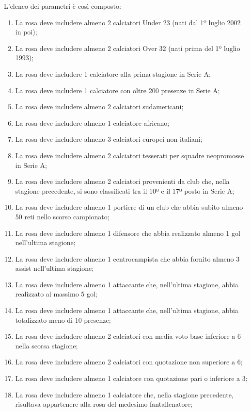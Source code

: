 \noindent L'elenco dei parametri è così composto:
\begin{enumerate}
    \item La rosa deve includere almeno 2 calciatori Under 23 (nati dal 1º luglio 2002 in poi);
    \item La rosa deve includere almeno 2 calciatori Over 32 (nati prima del 1º luglio 1993);
    \item La rosa deve includere 1 calciatore alla prima stagione in Serie A;
    \item La rosa deve includere 1 calciatore con oltre 200 presenze in Serie A;
    \item La rosa deve includere almeno 2 calciatori sudamericani;
    \item La rosa deve includere almeno 1 calciatore africano;
    \item La rosa deve includere almeno 3 calciatori europei non italiani;
    \item La rosa deve includere almeno 2 calciatori tesserati per squadre neopromosse in Serie A;
    \item La rosa deve includere almeno 2 calciatori provenienti da club che, nella stagione precedente, si sono classificati tra il 10º e il 17º posto in Serie A;
    \item La rosa deve includere almeno 1 portiere di un club che abbia subito almeno 50 reti nello scorso campionato;
    \item La rosa deve includere almeno 1 difensore che abbia realizzato almeno 1 gol nell’ultima stagione;
    \item La rosa deve includere almeno 1 centrocampista che abbia fornito almeno 3 assist nell’ultima stagione;
    \item La rosa deve includere almeno 1 attaccante che, nell’ultima stagione, abbia realizzato al massimo 5 gol;
    \item La rosa deve includere almeno 1 attaccante che, nell’ultima stagione, abbia totalizzato meno di 10 presenze;
    \item La rosa deve includere almeno 2 calciatori con media voto base inferiore a 6 nella scorsa stagione;
    \item La rosa deve includere almeno 2 calciatori con quotazione non superiore a 6;
    \item La rosa deve includere almeno 1 calciatore con quotazione pari o inferiore a 3;
    \item La rosa deve includere almeno 1 calciatore che, nella stagione precedente, risultava appartenere alla rosa del medesimo fantallenatore;

\end{enumerate}
